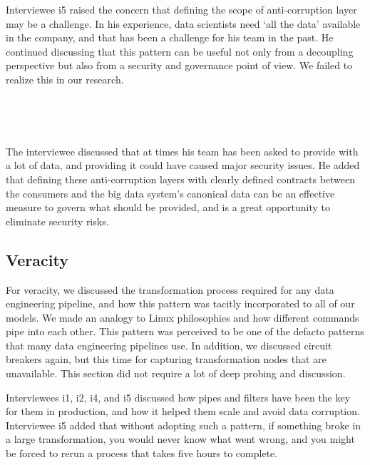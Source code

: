 \documentclass{bmcart}
\begin{document}
Interviewee i5 raised the concern that defining the scope of anti-corruption layer may be a challenge. In his experience, data scientists need `all the data' available in the company, and that has been a challenge for his team in the past. He continued discussing that this pattern can be useful not only from a decoupling perspective but also from a security and governance point of view. We failed to realize this in our research. 

\,

\setlength{\fboxsep}{0.7em}
\noindent{}

\,

The interviewee discussed that at times his team has been asked to provide with a lot of data, and providing it could have caused major security issues. He added that defining these anti-corruption layers with clearly defined contracts between the consumers and the big data system's canonical data can be an effective measure to govern what should be provided, and is a great opportunity to eliminate security risks.  



\subsection{Veracity}

For veracity, we discussed the transformation process required for any data engineering pipeline, and how this pattern was tacitly incorporated to all of our models. We made an analogy to Linux philosophies and how different commands pipe into each other. This pattern was perceived to be one of the defacto patterns that many data engineering pipelines use. In addition, we discussed circuit breakers again, but this time for capturing transformation nodes that are unavailable. This section did not require a lot of deep probing and discussion. 


Interviewees i1, i2, i4, and i5 discussed how pipes and filters have been the key for them in production, and how it helped them scale and avoid data corruption. Interviewee i5 added that without adopting such a pattern, if something broke in a large transformation, you would never know what went wrong, and you might be forced to rerun a process that takes five hours to complete. 

\,
\end{document}
